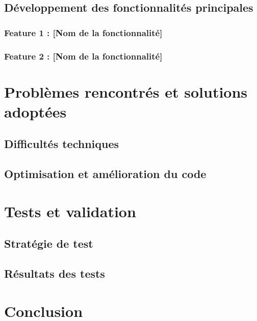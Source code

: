 \subsection{Développement des fonctionnalités principales}

\subsubsection{Feature 1 : [Nom de la fonctionnalité]}

\subsubsection{Feature 2 : [Nom de la fonctionnalité]}

\section{Problèmes rencontrés et solutions adoptées}
\subsection{Difficultés techniques}

\subsection{Optimisation et amélioration du code}

\section{Tests et validation}
\subsection{Stratégie de test}

\subsection{Résultats des tests}

\section{Conclusion}
\clearpage
